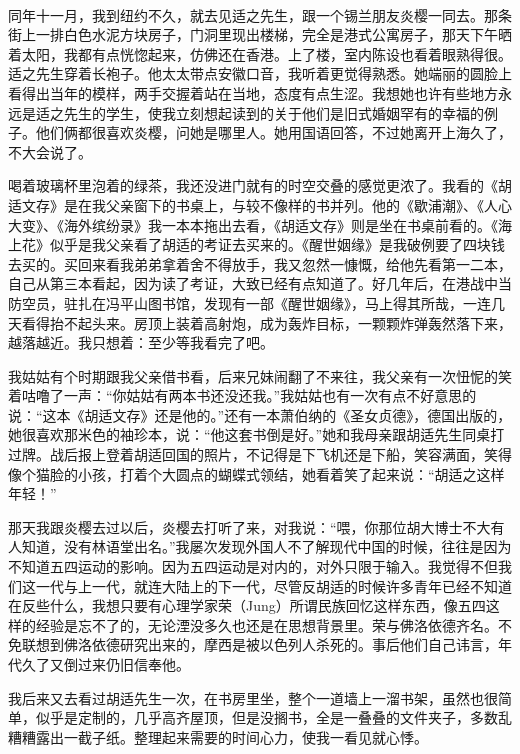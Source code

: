 \par {}
\par {}
\par {}
\par  
\par 同年十一月，我到纽约不久，就去见适之先生，跟一个锡兰朋友炎樱一同去。那条街上一排白色水泥方块房子，门洞里现出楼梯，完全是港式公寓房子，那天下午晒着太阳，我都有点恍惚起来，仿佛还在香港。上了楼，室内陈设也看着眼熟得很。适之先生穿着长袍子。他太太带点安徽口音，我听着更觉得熟悉。她端丽的圆脸上看得出当年的模样，两手交握着站在当地，态度有点生涩。我想她也许有些地方永远是适之先生的学生，使我立刻想起读到的关于他们是旧式婚姻罕有的幸福的例子。他们俩都很喜欢炎樱，问她是哪里人。她用国语回答，不过她离开上海久了，不大会说了。
\par 喝着玻璃杯里泡着的绿茶，我还没进门就有的时空交叠的感觉更浓了。我看的《胡适文存》是在我父亲窗下的书桌上，与较不像样的书并列。他的《歇浦潮》、《人心大变》、《海外缤纷录》我一本本拖出去看，《胡适文存》则是坐在书桌前看的。《海上花》似乎是我父亲看了胡适的考证去买来的。《醒世姻缘》是我破例要了四块钱去买的。买回来看我弟弟拿着舍不得放手，我又忽然一慷慨，给他先看第一二本，自己从第三本看起，因为读了考证，大致已经有点知道了。好几年后，在港战中当防空员，驻扎在冯平山图书馆，发现有一部《醒世姻缘》，马上得其所哉，一连几天看得抬不起头来。房顶上装着高射炮，成为轰炸目标，一颗颗炸弹轰然落下来，越落越近。我只想着：至少等我看完了吧。
\par 我姑姑有个时期跟我父亲借书看，后来兄妹闹翻了不来往，我父亲有一次忸怩的笑着咕噜了一声：“你姑姑有两本书还没还我。”我姑姑也有一次有点不好意思的说：“这本《胡适文存》还是他的。”还有一本萧伯纳的《圣女贞德》，德国出版的，她很喜欢那米色的袖珍本，说：“他这套书倒是好。”她和我母亲跟胡适先生同桌打过牌。战后报上登着胡适回国的照片，不记得是下飞机还是下船，笑容满面，笑得像个猫脸的小孩，打着个大圆点的蝴蝶式领结，她看着笑了起来说：“胡适之这样年轻！”
\par 那天我跟炎樱去过以后，炎樱去打听了来，对我说：“喂，你那位胡大博士不大有人知道，没有林语堂出名。”我屡次发现外国人不了解现代中国的时候，往往是因为不知道五四运动的影响。因为五四运动是对内的，对外只限于输入。我觉得不但我们这一代与上一代，就连大陆上的下一代，尽管反胡适的时候许多青年已经不知道在反些什么，我想只要有心理学家荣（Jung）所谓民族回忆这样东西，像五四这样的经验是忘不了的，无论湮没多久也还是在思想背景里。荣与佛洛依德齐名。不免联想到佛洛依德研究出来的，摩西是被以色列人杀死的。事后他们自己讳言，年代久了又倒过来仍旧信奉他。
\par 我后来又去看过胡适先生一次，在书房里坐，整个一道墙上一溜书架，虽然也很简单，似乎是定制的，几乎高齐屋顶，但是没搁书，全是一叠叠的文件夹子，多数乱糟糟露出一截子纸。整理起来需要的时间心力，使我一看见就心悸。
